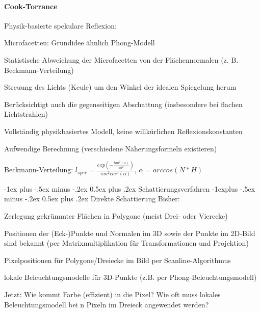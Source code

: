 \documentclass[landscape]{article}
\makeatletter
\renewcommand{\section}{\@startsection{section}{1}{0mm}%
                                {-1ex plus -.5ex minus -.2ex}%
                                {0.5ex plus .2ex}%
                                {\normalfont\large\bfseries}}
\renewcommand{\subsection}{\@startsection{subsection}{2}{0mm}%
                                {-1explus -.5ex minus -.2ex}%
                                {0.5ex plus .2ex}%
                                {\normalfont\normalsize\bfseries}}
\makeatother
\begin{document}
\begin{multicols}{3}
  \paragraph{Cook-Torrance}
  \begin{itemize*}
    \item Physik-basierte spekulare Reflexion:
    \item Microfacetten: Grundidee ähnlich Phong-Modell
    \item Statistische Abweichung der Microfacetten von der Flächennormalen (z. B. Beckmann-Verteilung)
    \item Streuung des Lichts (Keule) um den Winkel der idealen Spiegelung herum
    \item Berücksichtigt auch die gegenseitigen Abschattung (insbesondere bei flachen Lichtstrahlen)
    \item Vollständig physikbasiertes Modell, keine willkürlichen Reflexionskonstanten
    \item Aufwendige Berechnung (verschiedene Näherungsformeln existieren)
    \item Beckmann-Verteilung: $l_{spec}=\frac{exp(-\frac{tan^2(\alpha)}{m^2})}{\pi m^2 cos^4 (\alpha)}$, $\alpha=arccos(N*H)$
  \end{itemize*}
  
  \section{Schattierungsverfahren}
  \subsection{ Direkte Schattierung}
  Bisher:
  \begin{itemize*}
    \item Zerlegung gekrümmter Flächen in Polygone (meist Drei- oder Vierecke)
    \item Positionen der (Eck-)Punkte und Normalen im 3D sowie der Punkte im 2D-Bild sind bekannt (per Matrixmultiplikation für Transformationen und Projektion)
    \item Pixelpositionen für Polygone/Dreiecke im Bild per Scanline-Algorithmus
    \item lokale Beleuchtungsmodelle für 3D-Punkte (z.B. per Phong-Beleuchtungsmodell)
  \end{itemize*}
  
  Jetzt: Wie kommt Farbe (effizient) in die Pixel? Wie oft muss lokales Beleuchtungsmodell bei n Pixeln im Dreieck angewendet werden?
  

\end{multicols}
\end{document}
